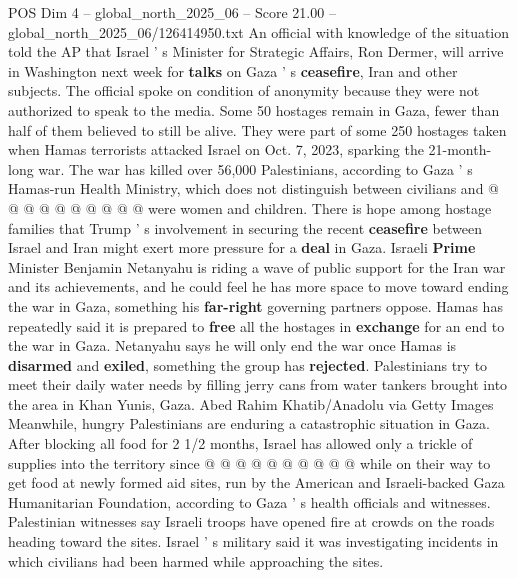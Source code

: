 \begin{textsample}{POS Dim 4 – global\_north\_2025\_06 – Score 21.00 – global\_north\_2025\_06/126414950.txt}
An official with knowledge of the situation told the AP that Israel ' s Minister for Strategic Affairs, Ron Dermer, will arrive in Washington next week for \textbf{talks} on Gaza ' s \textbf{ceasefire}, Iran and other subjects.
The official spoke on condition of anonymity because they were not authorized to speak to the media.
Some 50 hostages remain in Gaza, fewer than half of them believed to still be alive.
They were part of some 250 hostages taken when Hamas terrorists attacked Israel on Oct. 7, 2023, sparking the 21-month-long war.
The war has killed over 56,000 Palestinians, according to Gaza ' s Hamas-run Health Ministry, which does not distinguish between civilians and @ @ @ @ @ @ @ @ @ @ were women and children.
There is hope among hostage families that Trump ' s involvement in securing the recent \textbf{ceasefire} between Israel and Iran might exert more pressure for a \textbf{deal} in Gaza.
Israeli \textbf{Prime} Minister Benjamin Netanyahu is riding a wave of public support for the Iran war and its achievements, and he could feel he has more space to move toward ending the war in Gaza, something his \textbf{far-right} governing partners oppose.
Hamas has repeatedly said it is prepared to \textbf{free} all the hostages in \textbf{exchange} for an end to the war in Gaza.
Netanyahu says he will only end the war once Hamas is \textbf{disarmed} and \textbf{exiled}, something the group has \textbf{rejected}.
Palestinians try to meet their daily water needs by filling jerry cans from water tankers brought into the area in Khan Yunis, Gaza.
Abed Rahim Khatib/Anadolu via Getty Images Meanwhile, hungry Palestinians are enduring a catastrophic situation in Gaza.
After blocking all food for 2 1/2 months, Israel has allowed only a trickle of supplies into the territory since @ @ @ @ @ @ @ @ @ @ while on their way to get food at newly formed aid sites, run by the American and Israeli-backed Gaza Humanitarian Foundation, according to Gaza ' s health officials and witnesses.
Palestinian witnesses say Israeli troops have opened fire at crowds on the roads heading toward the sites.
Israel ' s military said it was investigating incidents in which civilians had been harmed while approaching the sites.

\end{textsample}
